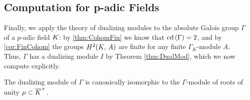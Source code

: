 \documentclass[a4paper, oneside]{memoir}
\begin{document}
\subsection{Computation for p-adic Fields}

Finally, we apply the theory of dualizing modules to the absolute Galois group \(\Gamma\) of a \(p\)-adic field \(K\): by \ref{thm:CohomFin} we know that \(\operatorname{cd}{(\Gamma)}=2\), and by \ref{cor:FinCohom} the groups \(H^{2}( K, \, A )\) are finite for any finite \(\Gamma_K\)-module $A$. Thus, \(\Gamma\) has a dualizing module \(I\) by Theorem \ref{thm:DualMod}, which we now compute explicitly.

\begin{proposition}\label{prop:DualModMu}
	The dualizing module of \(\Gamma\) is canonically isomorphic to the \(\Gamma\)-module of roots of unity \(\mu\subset\overline{K}^\times\).
\end{proposition}
\end{document}
